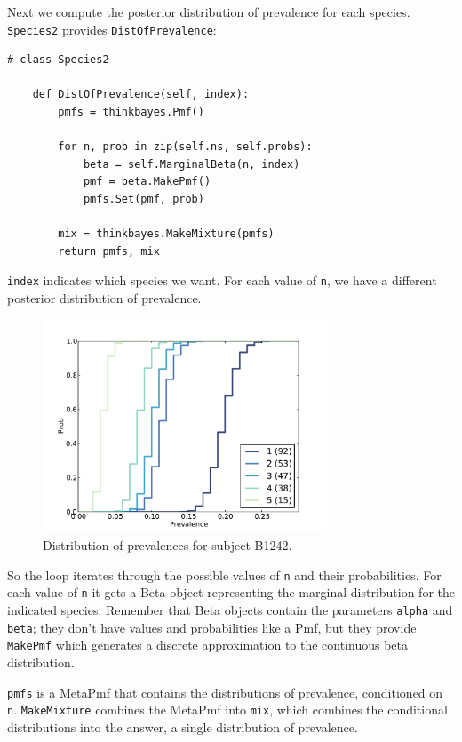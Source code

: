 \documentclass[12pt]{book}
\begin{document}
Next we compute the posterior distribution of prevalence for
each species.  {\tt Species2} provides {\tt DistOfPrevalence}:

\begin{verbatim}
# class Species2

    def DistOfPrevalence(self, index):
        pmfs = thinkbayes.Pmf()

        for n, prob in zip(self.ns, self.probs):
            beta = self.MarginalBeta(n, index)
            pmf = beta.MakePmf()
            pmfs.Set(pmf, prob)

        mix = thinkbayes.MakeMixture(pmfs)
        return pmfs, mix
\end{verbatim}

{\tt index} indicates which species we want.  For each
value of {\tt n}, we have a different posterior distribution
of prevalence.  

\begin{figure}
\centerline{\includegraphics[height=2.5in]{figs/species-prev-B1242.pdf}}
\caption{Distribution of prevalences for subject B1242.}
\label{species-prev}
\end{figure}

So the loop iterates through the possible values of {\tt n}
and their probabilities.  For each value of {\tt n} it gets
a Beta object representing the marginal distribution for the
indicated species.  Remember that Beta objects contain the
parameters {\tt alpha} and {\tt beta}; they don't have
values and probabilities like a Pmf, but they provide {\tt MakePmf}
which generates a discrete approximation to the continuous
beta distribution.

{\tt pmfs} is a MetaPmf that contains the distributions
of prevalence, conditioned on {\tt n}.  {\tt MakeMixture}
combines the MetaPmf into {\tt mix}, which combines the
conditional distributions into the answer, a single distribution
of prevalence.
\end{document}
